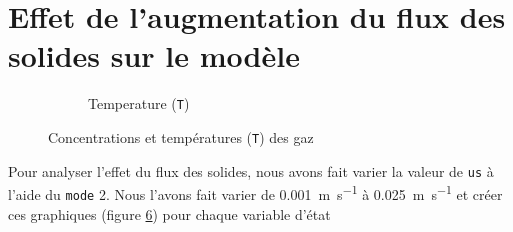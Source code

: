 \documentclass[11pt]{report}
\begin{document}
        \section{Effet de l'augmentation du flux des solides sur le modèle}
            \begin{figure}[ht]
                \centering
                \begin{subfigure}[t]{0.325\textwidth}
                    \centering
                    
                    \caption{}
                    \label{graph:con:2:CH4}
                \end{subfigure}
                \hfill
                \begin{subfigure}[t]{0.325\textwidth}
                    \centering
                    
                    \caption{}
                    \label{graph:con:2:H2}
                \end{subfigure}
                \hfill
                \begin{subfigure}[t]{0.325\textwidth}
                    \centering
                    
                    \caption{}
                    \label{graph:con:2:CO}
                \end{subfigure}
                \hfill
                \begin{subfigure}[t]{0.325\textwidth}
                    \centering
                    
                    \caption{}
                    \label{graph:con:2:CO2}
                \end{subfigure}
                \begin{subfigure}[t]{0.325\textwidth}
                    \centering
                    
                    \caption{Temperature (\texttt{T})}
                    \label{graph:con:2:T}
                \end{subfigure}
                \caption{Concentrations et températures (\texttt{T}) des gaz}
                \label{graph:con:2}
            \end{figure}
            Pour analyser l'effet du flux des solides,
            nous avons fait varier la valeur de \verb|us| à l'aide du \verb|mode| 2.
            Nous l'avons fait varier de \SI{0.001}{\meter\per\second} à \SI{0.025}{\meter\per\second}
            et créer ces graphiques (figure \ref{graph:con:2}) pour chaque variable d'état 
\end{document}
